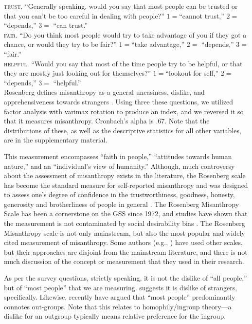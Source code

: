 \documentclass[11pt, letterpaper]{article}
\begin{document}
\begin{spacing}{1.4}
\indent\textsc{trust}. ``Generally speaking, would you say that most people can be trusted or that you can't be too
careful in dealing with people?''  $1=$``cannot trust,'' $2=$     ``depends,'' $3=$   ``can trust.''\\
\indent\textsc{fair}. ``Do you think most people would try to take advantage of you if they got a chance, or
would they try to be fair?'' $1=$``take advantage,'' $2=$       ``depends,'' $3=$          ``fair.'' \\
\indent\textsc{helpful}. ``Would you say that most of the time people try to be helpful, or that they are mostly just
looking out for themselves?'' $1=$``lookout for self,'' $2=$       ``depends,'' $3=$        ``helpful.''\\ 

Rosenberg defines misanthropy as a general uneasiness, dislike, and apprehensiveness towards strangers \citep{rosenberg56}. Using three these questions, we utilized factor analysis with varimax rotation to produce an index, and we reversed it so that it measures misanthropy. Cronbach's alpha is .67. Note that the distributions of these, as well as the descriptive statistics for all other variables, are in the supplementary material.

This measurement encompasses ``faith in people,'' ``attitudes towards human nature,'' and an ``individual's view of humanity.'' Although, much controversy about the assessment of misanthropy exists in the literature, the Rosenberg scale has become the standard measure for self-reported misanthropy and was designed to assess one's degree of confidence in the trustworthiness, goodness, honesty, generosity and brotherliness of people in general \citep{rosenberg56}. The Rosenberg Misanthropy Scale has been a cornerstone on the GSS since 1972, and studies have shown that the measurement is not contaminated by social desirability bias \citep{ray81}. 
The Rosenberg Misanthropy scale is not only mainstream, but also the most popular and widely cited measurement of misanthropy. Some authors (e.g.,  
\citet{wuensch2002misanthropy}) have used other scales, but their approaches are disjoint from the mainstream literature, and there is not much discussion of the concept or measurement that they used in their research.  

As per the survey questions, strictly speaking, it is not the dislike of ``all people,'' but of ``most people''  that we are measuring. \citet{wilson85} suggests it is dislike of strangers, specifically. Likewise, recently \citet{delhey11} have argued that ``most people'' predominantly connotes out-groups. Note that this relates to homophily/ingroup theory---a dislike for an outgroup typically means relative preference for the ingroup. 


\end{spacing}
\end{document}
